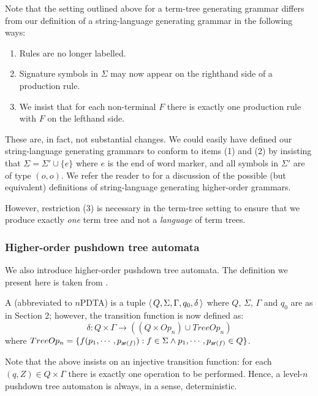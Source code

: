 \begin{remark} Note that the setting outlined above for a
term-tree generating grammar differs from our definition of a
string-language generating grammar in the following ways:
\begin{enumerate}
\item Rules are no longer labelled. \item Signature symbols in
$\Sigma$ may now appear on the righthand side of a production
rule. \item We insist that for each non-terminal $F$ there is
exactly one production rule with $F$ on the lefthand side.
\end{enumerate}
These are, in fact, not substantial changes. We could easily have
defined our string-language generating grammars to conform to
items (1) and (2) by insisting that $\Sigma = \Sigma' \cup \{e\}$
where $e$ is the end of word marker, and all symbols in $\Sigma'$ are of type
$(o,o)$. We refer the reader to \cite{dMO} for a discussion of the
possible (but equivalent) definitions of string-language
generating higher-order grammars.

However, restriction (3) is necessary in the term-tree setting to
ensure that we produce exactly \emph{one} term tree and not a
\emph{language} of term trees.
\end{remark}

\subsubsection*{Higher-order pushdown tree automata}

We also introduce higher-order pushdown tree automata. The
definition we present here is taken from \cite{KNU02}.

A  (abbreviated to
$n$PDTA) is a tuple $\langle\,{Q, \Sigma, \Gamma, q_0, \delta}\,\rangle$
where $Q$, $\Sigma$, $\Gamma$ and $q_0$ are as in Section 2;
however, the transition function is now defined as:
\begin{equation}
\nonumber \delta : Q \times \Gamma \rightarrow ((Q \times Op_n)
\cup TreeOp_n)
\end{equation}
where $TreeOp_n =  \{f(p_1, \cdots, p_{{\sf ar}(f)}) : f \in \Sigma
\wedge p_1, \cdots, p_{{\sf ar}(f)} \in Q\}$.\\

\begin{remark}Note that the above insists on an injective transition function: for
each $(q, Z) \in Q \times \Gamma$ there is exactly one operation
to be performed. Hence, a level-$n$ pushdown tree automaton is
always, in a sense, deterministic.
\end{remark}

